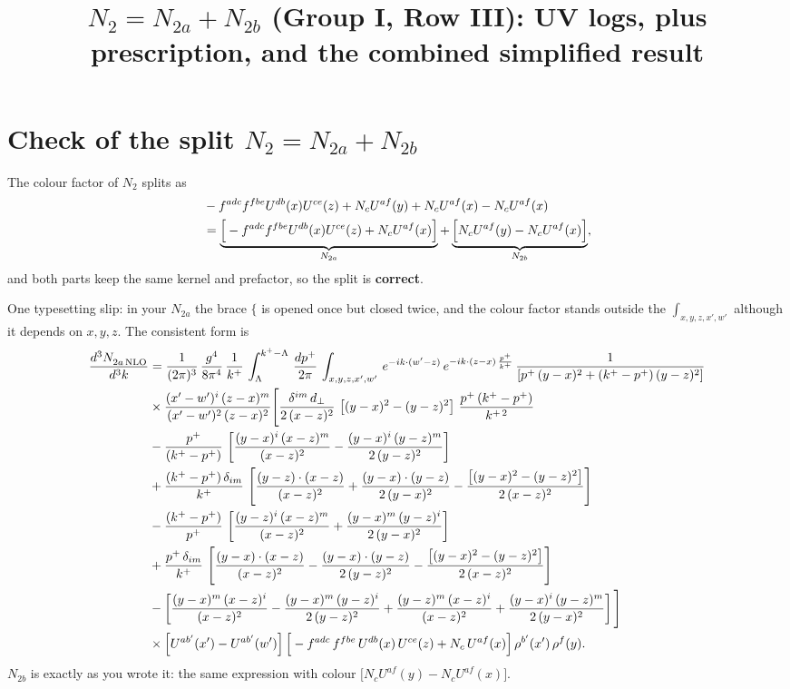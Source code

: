 \documentclass[10pt]{article}
\title{$N_{2}=N_{2a}+N_{2b}$ (Group I, Row III): UV logs, plus prescription, and the combined simplified result}
\date{}
\numberwithin{equation}{section}
\begin{document}
\maketitle

\section{Check of the split $N_{2}=N_{2a}+N_{2b}$}
The colour factor of $N_{2}$ splits as
\begin{align}
&-f^{adc}f^{fbe}U^{db}(x)U^{ce}(z)+N_{c}U^{af}(y)+N_{c}U^{af}(x)-N_{c}U^{af}(x)\notag\\
&=\underbrace{\Big[-f^{adc}f^{fbe}U^{db}(x)U^{ce}(z)+N_{c}U^{af}(x)\Big]}_{N_{2a}}+\underbrace{\Big[N_{c}U^{af}(y)-N_{c}U^{af}(x)\Big]}_{N_{2b}},
\end{align}
and both parts keep the same kernel and prefactor, so the split is \textbf{correct}.

One typesetting slip: in your $N_{2a}$ the brace $\Bigg\{$ is opened once but closed twice, and the colour factor stands outside the $\int_{x,y,z,x',w'}$ although it depends on $x,y,z$. The consistent form is
\begin{align}
    \frac{d^{3}N_{2a\,\rm NLO}^{\rm}}{d^{3}k}  & =  \frac{1}{(2\pi)^{3}}\, \frac{g^{4}}{8\pi^{4}}\,\frac{1}{k^{+}}\,\int_{\Lambda}^{k^{+}-\Lambda}\, \frac{dp^{+}}{2\pi} \, \int_{x,y,z,x',w'}\,e^{-ik\cdot(w'-z)}\,e^{-ik\cdot (z-x)\,\frac{p^{+}}{k^{+}}}\,\frac{1}{\left[p^{+}\,(y-x)^{2}+(k^{+}-p^{+})\,(y-z)^{2}\right]} \notag \\ & \times\frac{(x'-w')^{i}\,(z-x)^{m}}{(x'-w')^{2}\,(z-x)^{2}}\Bigg[\frac{\delta^{im}\,d_{\perp}}{2\,(x-z)^{2}}\,\left[(y-x)^{2}-(y-z)^{2}\right]\,\frac{p^{+}\,(k^{+}-p^{+})}{k^{+\,2}}\notag\\ &-\frac{p^{+}}{(k^{+}-p^{+})}\,\left[\frac{(y-x)^{i}\,(x-z)^{m}}{(x-z)^{2}}-\frac{(y-x)^{i}\,(y-z)^{m}}{2\,(y-z)^{2}}\right]\notag \\ & +\frac{(k^{+}-p^{+})\,\delta_{im}}{k^{+}}\,\left[\frac{(y-z)\cdot (x-z)}{(x-z)^{2}}+\frac{(y-x)\cdot (y-z)}{2\,(y-x)^{2}}-\frac{\left[(y-x)^{2}-(y-z)^{2}\right]}{2\,(x-z)^{2}}\right]\notag\\ & -\frac{(k^{+}-p^{+})}{p^{+}}\,\left[\frac{(y-z)^{i}\,(x-z)^{m}}{(x-z)^{2}}+\frac{(y-x)^{m}\,(y-z)^{i}}{2\,(y-x)^{2}}\right]\notag \\ & +\frac{p^{+}\,\delta_{im}}{k^{+}}\,\left[\frac{(y-x)\cdot (x-z)}{(x-z)^{2}}-\frac{(y-x)\cdot (y-z)}{2\,(y-z)^{2}}-\frac{\left[(y-x)^{2}-(y-z)^{2}\right]}{2\,(x-z)^{2}}\right]\notag \\ &-\left[\frac{(y-x)^{m}\,(x-z)^{i}}{(x-z)^{2}}-\frac{(y-x)^{m}\,(y-z)^{i}}{2\,(y-z)^{2}}+\frac{(y-z)^{m}\,(x-z)^{i}}{(x-z)^{2}}+\frac{(y-x)^{i}\,(y-z)^{m}}{2\,(y-x)^{2}}\right]\Bigg]\notag \\ & \times\Big[U^{ab'}(x')-U^{ab'}(w')\Big]\,\Big[-f^{adc}\,f^{fbe}\,U^{db}(x)\,U^{ce}(z)+N_{c}\,U^{af}(x)\Big]\,\rho^{b'}(x')\,\rho^{f}(y).
\label{eq:N2a}
\end{align}
$N_{2b}$ is exactly as you wrote it: the same expression with colour $\big[N_{c}U^{af}(y)-N_{c}U^{af}(x)\big]$.
\end{document}
